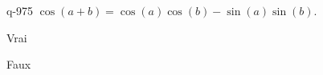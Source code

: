 \begin{truefalse}{q-975}
$\cos(a+b)=\cos(a)\cos(b)-\sin(a)\sin(b)$.
\item* Vrai
\item Faux
\end{truefalse}

